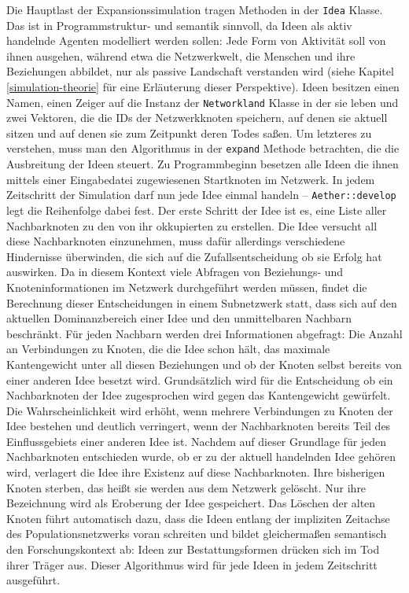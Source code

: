 \documentclass[openany,twoside,twocolumn]{book}
\begin{document}
Die Hauptlast der Expansionssimulation tragen Methoden in der
\texttt{Idea} Klasse. Das ist in Programmstruktur- und semantik
sinnvoll, da Ideen als aktiv handelnde Agenten modelliert werden sollen:
Jede Form von Aktivität soll von ihnen ausgehen, während etwa die
Netzwerkwelt, die Menschen und ihre Beziehungen abbildet, nur als
passive Landschaft verstanden wird (siehe Kapitel
\ref{simulation-theorie} für eine Erläuterung dieser Perspektive). Ideen
besitzen einen Namen, einen Zeiger auf die Instanz der
\texttt{Networkland} Klasse in der sie leben und zwei Vektoren, die die
IDs der Netzwerkknoten speichern, auf denen sie aktuell sitzen und auf
denen sie zum Zeitpunkt deren Todes saßen. Um letzteres zu verstehen,
muss man den Algorithmus in der \texttt{expand} Methode betrachten, die
die Ausbreitung der Ideen steuert. Zu Programmbeginn besetzen alle Ideen
die ihnen mittels einer Eingabedatei zugewiesenen Startknoten im
Netzwerk. In jedem Zeitschritt der Simulation darf nun jede Idee einmal
handeln -- \texttt{Aether::develop} legt die Reihenfolge dabei fest. Der
erste Schritt der Idee ist es, eine Liste aller Nachbarknoten zu den von
ihr okkupierten zu erstellen. Die Idee versucht all diese Nachbarknoten
einzunehmen, muss dafür allerdings verschiedene Hindernisse überwinden,
die sich auf die Zufallsentscheidung ob sie Erfolg hat auswirken. Da in
diesem Kontext viele Abfragen von Beziehungs- und Knoteninformationen im
Netzwerk durchgeführt werden müssen, findet die Berechnung dieser
Entscheidungen in einem Subnetzwerk statt, dass sich auf den aktuellen
Dominanzbereich einer Idee und den unmittelbaren Nachbarn beschränkt.
Für jeden Nachbarn werden drei Informationen abgefragt: Die Anzahl an
Verbindungen zu Knoten, die die Idee schon hält, das maximale
Kantengewicht unter all diesen Beziehungen und ob der Knoten selbst
bereits von einer anderen Idee besetzt wird. Grundsätzlich wird für die
Entscheidung ob ein Nachbarknoten der Idee zugesprochen wird gegen das
Kantengewicht gewürfelt. Die Wahrscheinlichkeit wird erhöht, wenn
mehrere Verbindungen zu Knoten der Idee bestehen und deutlich
verringert, wenn der Nachbarknoten bereits Teil des Einflussgebiets
einer anderen Idee ist. Nachdem auf dieser Grundlage für jeden
Nachbarknoten entschieden wurde, ob er zu der aktuell handelnden Idee
gehören wird, verlagert die Idee ihre Existenz auf diese Nachbarknoten.
Ihre bisherigen Knoten sterben, das heißt sie werden aus dem Netzwerk
gelöscht. Nur ihre Bezeichnung wird als Eroberung der Idee gespeichert.
Das Löschen der alten Knoten führt automatisch dazu, dass die Ideen
entlang der impliziten Zeitachse des Populationsnetzwerks voran
schreiten und bildet gleichermaßen semantisch den Forschungskontext ab:
Ideen zur Bestattungsformen drücken sich im Tod ihrer Träger aus. Dieser
Algorithmus wird für jede Ideen in jedem Zeitschritt ausgeführt.
\end{document}
